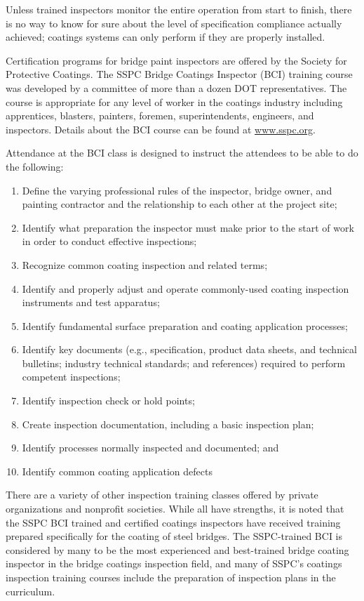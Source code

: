 Unless trained inspectors monitor the entire operation from start to finish, there is no way to know for sure about
the level of specification compliance actually achieved; coatings systems can only perform if they are properly
installed.

Certification programs for bridge paint inspectors are offered by the Society for Protective Coatings. The SSPC
Bridge Coatings Inspector (BCI) training course was developed by a committee of more than a dozen DOT
representatives. The course is appropriate for any level of worker in the coatings industry including apprentices,
blasters, painters, foremen, superintendents, engineers, and inspectors. Details about the BCI course can be found at \url{www.sspc.org}.

Attendance at the BCI class is designed to instruct the attendees to be able to do the following:
\begin{enumerate}
  \item Define the varying professional rules of the inspector, bridge owner, and painting contractor and the relationship to each other at the project site;
  \item Identify what preparation the inspector must make prior to the start of work in order to conduct effective inspections;
  \item Recognize common coating inspection and related terms;
  \item Identify and properly adjust and operate commonly-used coating inspection instruments and test
  apparatus;
  \item Identify fundamental surface preparation and coating application processes;
  \item Identify key documents (e.g., specification, product data sheets, and technical bulletins; industry
  technical standards; and references) required to perform competent inspections;
  \item Identify inspection check or hold points;
  \item Create inspection documentation, including a basic inspection plan;
  \item Identify processes normally inspected and documented; and
  \item Identify common coating application defects
\end{enumerate}

There are a variety of other inspection training classes offered by private organizations and nonprofit societies.
While all have strengths, it is noted that the SSPC BCI trained and certified coatings inspectors have received
training prepared specifically for the coating of steel bridges. The SSPC-trained BCI is considered by many to be the
most experienced and best-trained bridge coating inspector in the bridge coatings inspection field, and many of
SSPC’s coatings inspection training courses include the preparation of inspection plans in the curriculum.

